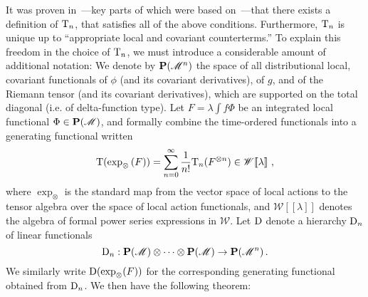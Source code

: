 \documentclass[12pt]{article}
\newcommand{\eW}{\mathscr{W}}
\newcommand{\D}{{\rm D}}
\newcommand{\M}{\mathscr{M}}
\renewcommand{\O}{\Phi}
\newcommand{\T}{{\rm T}}
\renewcommand{\P}{{\bf P}}
\newcommand{\rf}[1]{[\![#1]\!]}
\theoremstyle{plain}
\theoremstyle{definition}
\def\ben{\begin{equation}}
\def\een{\end{equation}}
\begin{document}
It was proven in~\cite{hw2}---key parts of which were based on~\cite{bf2}---that there exists a definition
of $\T_n$, that satisfies all of the above conditions. Furthermore, $\T_n$ is unique up to ``appropriate local and covariant counterterms.'' To explain this freedom in the choice of $\T_n$, we must introduce a considerable amount
of additional notation:  We denote by $\P(\M^n)$ the space of all
distributional local, covariant functionals of $\phi$ (and its covariant
derivatives), of $g$, and of the Riemann tensor (and its covariant derivatives),
which are supported on the total diagonal (i.e. of delta-function type). Let $F= \lambda \int f  \O$ be an integrated local
functional $\O \in \P(\M)$, and formally combine the
time-ordered functionals into a generating functional
written
\ben
\T(\exp_\otimes \left( F \right) ) = \sum_{n=0}^\infty \frac{1}{n!} \T_n(F^{\otimes n}) \in \eW \rf{\lambda}~,
\label{wlambda}
\een
where $\exp_\otimes$ is the
standard map from the vector space  of local actions to the tensor algebra
over the space of local action functionals, and $\eW \rf{\lambda}$ denotes the algebra of formal
power series expressions in $\eW$. Let $\D$ denote a
hierarchy $\D_n$ of linear functionals
\ben\label{Dndef}
\D_n: \P(\M) \otimes \dots \otimes \P(\M) \to
\P(\M^n) \, .
\een
We similarly write $\D(\exp_\otimes (F))$ for the corresponding generating functional
obtained from $\D_n$. We then have the following theorem:
\end{document}
